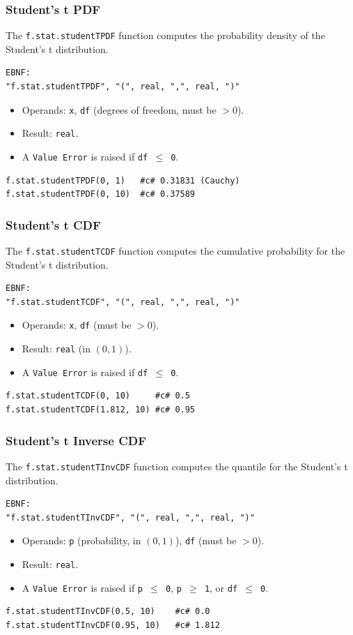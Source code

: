 \subsubsection{Student's t PDF}
The \texttt{f.stat.studentTPDF} function computes the probability density of the Student's t distribution.
\begin{verbatim}
EBNF:
"f.stat.studentTPDF", "(", real, ",", real, ")"
\end{verbatim}
\begin{itemize}
\item Operands: \texttt{x}, \texttt{df} (degrees of freedom, must be $> 0$).
\item Result: \texttt{real}.
\item A \texttt{Value Error} is raised if \texttt{df $\leq$ 0}.
\end{itemize}
\begin{verbatim}
f.stat.studentTPDF(0, 1)   #c# 0.31831 (Cauchy)
f.stat.studentTPDF(0, 10)  #c# 0.37589
\end{verbatim}

\subsubsection{Student's t CDF}
The \texttt{f.stat.studentTCDF} function computes the cumulative probability for the Student's t distribution.
\begin{verbatim}
EBNF:
"f.stat.studentTCDF", "(", real, ",", real, ")"
\end{verbatim}
\begin{itemize}
\item Operands: \texttt{x}, \texttt{df} (must be $> 0$).
\item Result: \texttt{real} (in $(0, 1)$).
\item A \texttt{Value Error} is raised if \texttt{df $\leq$ 0}.
\end{itemize}
\begin{verbatim}
f.stat.studentTCDF(0, 10)     #c# 0.5
f.stat.studentTCDF(1.812, 10) #c# 0.95
\end{verbatim}

\subsubsection{Student's t Inverse CDF}
The \texttt{f.stat.studentTInvCDF} function computes the quantile for the Student's t distribution.
\begin{verbatim}
EBNF:
"f.stat.studentTInvCDF", "(", real, ",", real, ")"
\end{verbatim}
\begin{itemize}
\item Operands: \texttt{p} (probability, in $(0, 1)$), \texttt{df} (must be $> 0$).
\item Result: \texttt{real}.
\item A \texttt{Value Error} is raised if \texttt{p $\leq$ 0}, \texttt{p $\geq$ 1}, or \texttt{df $\leq$ 0}.
\end{itemize}
\begin{verbatim}
f.stat.studentTInvCDF(0.5, 10)    #c# 0.0
f.stat.studentTInvCDF(0.95, 10)   #c# 1.812
\end{verbatim}

